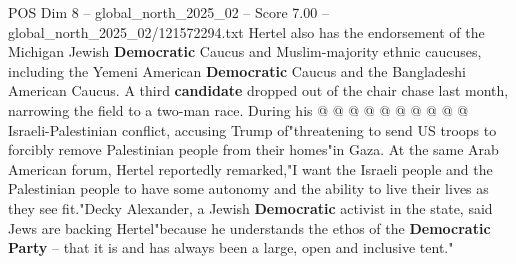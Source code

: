 \begin{textsample}{POS Dim 8 – global\_north\_2025\_02 – Score 7.00 – global\_north\_2025\_02/121572294.txt}
Hertel also has the endorsement of the Michigan Jewish \textbf{Democratic} Caucus and Muslim-majority ethnic caucuses, including the Yemeni American \textbf{Democratic} Caucus and the Bangladeshi American Caucus.
A third \textbf{candidate} dropped out of the chair chase last month, narrowing the field to a two-man race.
During his @ @ @ @ @ @ @ @ @ @ Israeli-Palestinian conflict, accusing Trump of"threatening to send US troops to forcibly remove Palestinian people from their homes"in Gaza.
At the same Arab American forum, Hertel reportedly remarked,"I want the Israeli people and the Palestinian people to have some autonomy and the ability to live their lives as they see fit."Decky Alexander, a Jewish \textbf{Democratic} activist in the state, said Jews are backing Hertel"because he understands the ethos of the \textbf{Democratic} \textbf{Party} -- that it is and has always been a large, open and inclusive tent."

\end{textsample}
